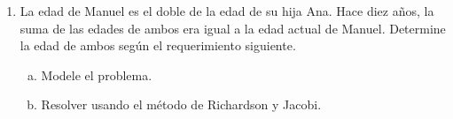 \documentclass[
	spanish,
	8pt,
	utf8,
	xcolor=table,
	handout,
	aspectratio=169,
	professionalfonts,
	notheorems,
	mathserif,
]{beamer}
\newcounter{savedenum}
\newcommand*{\saveenum}{\setcounter{savedenum}{\theenumi}}
\begin{document}
\begin{frame}
\begin{enumerate}
		      \begin{multicols}{2}
			      \begin{enumerate}[a)]
				      \item

				            Modele el problema.

				      \item

				            Resolver usando el método de Richardson y Jacobi.
			      \end{enumerate}
		      \end{multicols}

		\item

		      La edad de Manuel es el doble de la edad de su hija Ana.
		      Hace diez años, la suma de las edades de ambos era igual a
		      la edad actual de Manuel.
		      Determine la edad de ambos según el requerimiento siguiente.


		      \begin{multicols}{2}
			      \begin{enumerate}[a)]
				      \item

				            Modele el problema.

				      \item

				            Resolver usando el método de Richardson y Jacobi.
			      \end{enumerate}
		      \end{multicols}
		      \saveenum
	\end{enumerate}
\end{frame}
\end{document}
